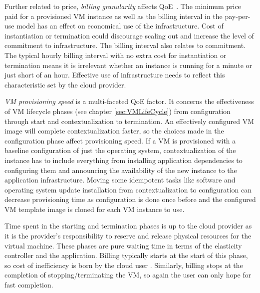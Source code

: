 \documentclass[english]{tktltiki2}
\theoremstyle{definition}
\theoremstyle{remark}
\begin{document}
Further related to price, \textit{billing granularity} affects
QoE~\cite{Brebner2012a}\cite{Islam2012}\cite{Mao2011}\cite{VandenBossche2010}.
The minimum price paid for a provisioned VM instance as well as the billing
interval in the pay-per-use model has an effect on economical use of the
infrastructure. Cost of instantiation or termination could discourage scaling
out and increase the level of commitment to infrastructure. The billing interval
also relates to commitment. The typical hourly billing interval with no extra
cost for instantiation or termination means it is irrelevant whether an instance
is running for a minute or just short of an hour. Effective use of
infrastructure needs to reflect this characteristic set by the cloud provider.

\textit{VM provisioning speed} is a multi-faceted QoE factor. It concerns the
effectiveness of VM lifecycle phases (see chapter \ref{sec:VMLifeCycle}) from
configuration through start and contextualization to termination. An effectively
configured VM image will complete contextualization faster, so the choices made
in the configuration phase affect provisioning speed. If a VM is provisioned
with a baseline configuration of just the operating system, contextualization of
the instance has to include everything from installing application dependencies
to configuring them and announcing the availability of the new instance to the
application infrastructure. Moving some idempotent tasks like software and
operating system update installation from contextualization to configuration can
decrease provisioning time as configuration is done once before and the
configured VM template image is cloned for each VM instance to use.

Time spent in the starting and termination phases is up to the cloud provider as
it is the provider's responsibility to reserve and release physical resources
for the virtual machine. These phases are pure waiting time in terms of the
elasticity controller and the application. Billing typically starts at the start
of this phase, so cost of inefficiency is born by the cloud user . Similarly,
billing stops at the completion of stopping/terminating the VM, so again the
user can only hope for fast completion.
\end{document}
